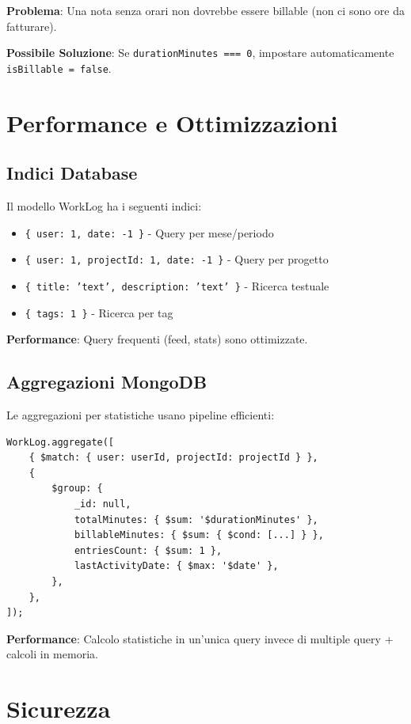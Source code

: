 \documentclass[11pt,a4paper]{article}
\begin{document}
\textbf{Problema}: Una nota senza orari non dovrebbe essere billable (non ci sono ore da fatturare).

\textbf{Possibile Soluzione}: Se \texttt{durationMinutes === 0}, impostare automaticamente \texttt{isBillable = false}.

\section{Performance e Ottimizzazioni}

\subsection{Indici Database}

Il modello WorkLog ha i seguenti indici:

\begin{itemize}
    \item \texttt{\{ user: 1, date: -1 \}} - Query per mese/periodo
    \item \texttt{\{ user: 1, projectId: 1, date: -1 \}} - Query per progetto
    \item \texttt{\{ title: 'text', description: 'text' \}} - Ricerca testuale
    \item \texttt{\{ tags: 1 \}} - Ricerca per tag
\end{itemize}

\textbf{Performance}: Query frequenti (feed, stats) sono ottimizzate.

\subsection{Aggregazioni MongoDB}

Le aggregazioni per statistiche usano pipeline efficienti:

\begin{lstlisting}[caption=Esempio Aggregazione Stats]
WorkLog.aggregate([
    { $match: { user: userId, projectId: projectId } },
    {
        $group: {
            _id: null,
            totalMinutes: { $sum: '$durationMinutes' },
            billableMinutes: { $sum: { $cond: [...] } },
            entriesCount: { $sum: 1 },
            lastActivityDate: { $max: '$date' },
        },
    },
]);
\end{lstlisting}

\textbf{Performance}: Calcolo statistiche in un'unica query invece di multiple query + calcoli in memoria.

\section{Sicurezza}
\end{document}
